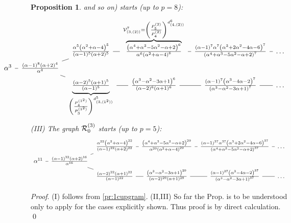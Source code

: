\documentclass{article}
\newcommand{\ppmm}[1]{#1}  %
\newtheorem{proposition}[theorem]{Proposition}
\theoremstyle{definition}
\newcommand{\mdef}{\refstepcounter{theorem}       \medskip \noindent ({\bf \thetheorem}) }
\numberwithin{equation}{subsection}
\begin{document}
\begin{proposition}
{and so on)} 
starts (up to $p=8$):  %
\[  \hspace{-1.5cm} 
\begin{tikzcd}[row sep=0em,column sep=0.5em]
&&\frac{\alpha ^5 \left(\alpha ^2+\alpha -4\right)^5}{(\alpha -1)^5 (\alpha +2)^5}\ar[r,dash]
  &
  \overbrace{
\tfrac{\left(\alpha ^4+\alpha ^3-5 \alpha ^2-\alpha +2\right)^6}{\alpha ^6 \left(\alpha ^2+\alpha -4\right)^6} 
 }^{\V^7_{(3,(2))} = \left( \frac{ P^{(2)}_{5}}{P^{(2)}_{4}} \right)^{d^6_{(4,(2))}} }  \ar[r,dash]
  &
  \frac{(\alpha -1)^7 \alpha ^7 \left(\alpha ^3+2 \alpha ^2-4 \alpha -6\right)^7}{\left(\alpha ^4+\alpha ^3-5 \alpha ^2-\alpha +2\right)^7}\ar[r,dash]
  & \dots
  \\
    \alpha^3\ar[r,dash]&\frac{(\alpha -1)^8 (\alpha +2)^4}{\alpha ^4}\ar[ur,dash]\ar[dr,dash]
    \\
    &&
    \underbrace{
    \tfrac{(\alpha -2)^5 (\alpha +1)^5}{(\alpha -1)^5}   }_{ \left( \frac{ P^{(1^2)}_{4}}{P^{(1^2)}_{3}} \right)^{d^5_{(3,(1^2))}} }   \ar[r,dash]
      &
      \frac{\left(\alpha ^3-\alpha ^2-3 \alpha +1\right)^6}{(\alpha -2)^6 (\alpha +1)^6}\ar[r,dash]
      &
      \frac{(\alpha -1)^7 \left(\alpha ^3-4 \alpha -2\right)^7}{\left(\alpha ^3-\alpha ^2-3 \alpha +1\right)^7}\ar[r,dash]
      & \dots
\end{tikzcd}
\]
(III)
The graph ${\mathcal{R}}^{(3)}_0$ starts (up to $p=5$):
\[\begin{tikzcd}[row sep=0em,column sep=0.5em]&&\frac{\alpha ^{22} \left(\alpha ^2+\alpha -4\right)^{22}}{(\alpha -1)^{22} (\alpha +2)^{22}}\ar[r,dash]&\frac{\left(\alpha ^4+\alpha ^3-5 \alpha ^2-\alpha +2\right)^{29}}{\alpha ^{29} \left(\alpha ^2+\alpha -4\right)^{29}}\ar[r,dash]&\frac{(\alpha -1)^{37} \alpha ^{37} \left(\alpha ^3+2 \alpha ^2-4 \alpha -6\right)^{37}}{\left(\alpha ^4+\alpha ^3-5 \alpha ^2-\alpha +2\right)^{37}}\ar[r,dash]&\dots\\
    \alpha^{11}\ar[r,dash]&\frac{(\alpha -1)^{32} (\alpha +2)^{16}}{\alpha ^{16}}\ar[ur,dash]\ar[dr,dash]\\
    &&\frac{(\alpha -2)^{22} (\alpha +1)^{22}}{(\alpha -1)^{22}}\ar[r,dash]&\frac{\left(\alpha ^3-\alpha ^2-3 \alpha +1\right)^{29}}{(\alpha -2)^{29} (\alpha +1)^{29}}\ar[r,dash]&\frac{(\alpha -1)^{37} \left(\alpha ^3-4 \alpha -2\right)^{37}}{\left(\alpha ^3-\alpha ^2-3 \alpha +1\right)^{37}}\ar[r,dash]&\dots
\end{tikzcd}\]
\end{proposition}
\noindent 
{\em Proof}. 
(I) follows from \ref{pr:1cupgram}. 
\ppmm{(II,III) So far the Prop. is to be understood only to apply for the cases explicitly shown. Thus proof is by direct calculation.  \qed}
\end{document}

